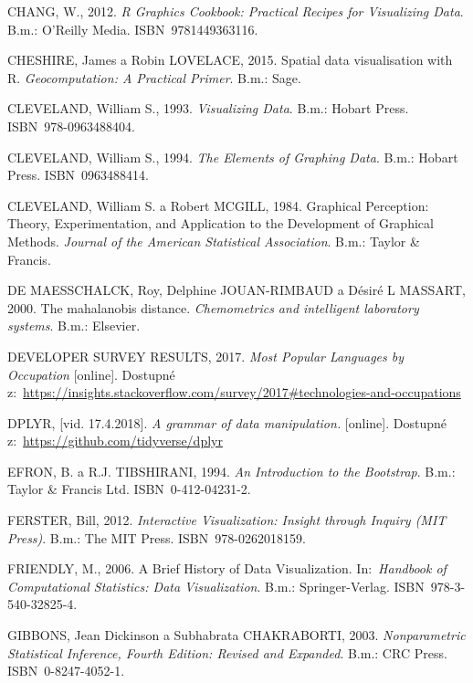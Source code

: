 \documentclass[12pt,]{article}
\begin{document}
\hypertarget{ref-chang2012}{}
CHANG, W., 2012. \emph{R Graphics Cookbook: Practical Recipes for
Visualizing Data}. B.m.: O'Reilly Media. ISBN~9781449363116.

\hypertarget{ref-spatial}{}
CHESHIRE, James a Robin LOVELACE, 2015. Spatial data visualisation with
R. \emph{Geocomputation: A Practical Primer}. B.m.: Sage.

\hypertarget{ref-cleveland1993}{}
CLEVELAND, William S., 1993. \emph{Visualizing Data}. B.m.: Hobart
Press. ISBN~978-0963488404.

\hypertarget{ref-cleveland1994}{}
CLEVELAND, William S., 1994. \emph{The Elements of Graphing Data}. B.m.:
Hobart Press. ISBN~0963488414.

\hypertarget{ref-cleveland_mcgill}{}
CLEVELAND, William S. a Robert MCGILL, 1984. Graphical Perception:
Theory, Experimentation, and Application to the Development of Graphical
Methods. \emph{Journal of the American Statistical Association}. B.m.:
Taylor \& Francis.

\hypertarget{ref-mbdist2}{}
DE MAESSCHALCK, Roy, Delphine JOUAN-RIMBAUD a Désiré L MASSART, 2000.
The mahalanobis distance. \emph{Chemometrics and intelligent laboratory
systems}. B.m.: Elsevier.

\hypertarget{ref-stackover}{}
DEVELOPER SURVEY RESULTS, 2017. \emph{Most Popular Languages by
Occupation} {[}online{]}. Dostupné
z:~\url{https://insights.stackoverflow.com/survey/2017\#technologies-and-occupations}

\hypertarget{ref-dplyr}{}
DPLYR, {[}vid. 17.4.2018{]}. \emph{A grammar of data manipulation.}
{[}online{]}. Dostupné z:~\url{https://github.com/tidyverse/dplyr}

\hypertarget{ref-bootstrap}{}
EFRON, B. a R.J. TIBSHIRANI, 1994. \emph{An Introduction to the
Bootstrap}. B.m.: Taylor \& Francis Ltd. ISBN~0-412-04231-2.

\hypertarget{ref-ferster}{}
FERSTER, Bill, 2012. \emph{Interactive Visualization: Insight through
Inquiry (MIT Press)}. B.m.: The MIT Press. ISBN~978-0262018159.

\hypertarget{ref-dataviz_history}{}
FRIENDLY, M., 2006. A Brief History of Data Visualization.
In:~\emph{Handbook of Computational Statistics: Data Visualization}.
B.m.: Springer-Verlag. ISBN~978-3-540-32825-4.

\hypertarget{ref-pp_wiki}{}
GIBBONS, Jean Dickinson a Subhabrata CHAKRABORTI, 2003.
\emph{Nonparametric Statistical Inference, Fourth Edition: Revised and
Expanded}. B.m.: CRC Press. ISBN~0-8247-4052-1.
\end{document}
